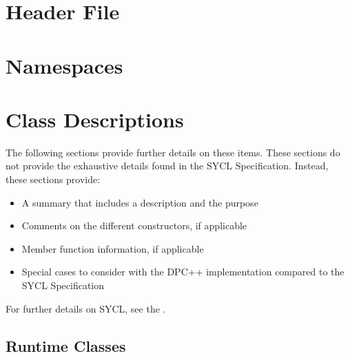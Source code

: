 \documentclass[letterpaper,10pt,english]{sphinxmanual}
\begin{document}
\section{Header File}
\label{\detokenize{programming-interface/index:header-file}}

\section{Namespaces}
\label{\detokenize{programming-interface/index:namespaces}}

\section{Class Descriptions}
\label{\detokenize{programming-interface/index:class-descriptions}}
The following sections provide further details on these items. These
sections do not provide the exhaustive details found in the SYCL
Specification. Instead, these sections provide:
\begin{itemize}
\item {} 
A summary that includes a description and the purpose

\item {} 
Comments on the different constructors, if applicable

\item {} 
Member function information, if applicable

\item {} 
Special cases to consider with the DPC++ implementation compared to
the SYCL Specification

\end{itemize}

For further details on SYCL, see the .


\subsection{Runtime Classes}
\label{\detokenize{programming-interface/runtime/index:runtime-classes}}\label{\detokenize{programming-interface/runtime/index::doc}}

\subsubsection{}
\label{\detokenize{programming-interface/runtime/device-selector:device-selector}}\label{\detokenize{programming-interface/runtime/device-selector::doc}}
\begin{sphinxVerbatim}[commandchars=\\\{\}]
 
\end{sphinxVerbatim}
\end{document}
